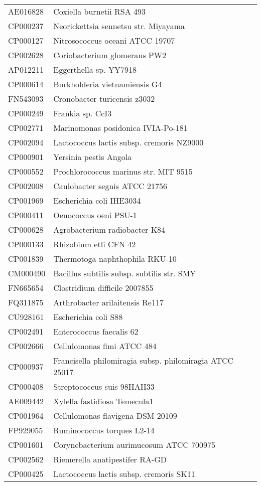 \begin{longtable}{ll}
AE016828 & Coxiella burnetii RSA 493\\
CP000237 & Neorickettsia sennetsu str. Miyayama\\
CP000127 & Nitrosococcus oceani ATCC 19707\\
CP002628 & Coriobacterium glomerans PW2\\
AP012211 & Eggerthella sp. YY7918\\
CP000614 & Burkholderia vietnamiensis G4\\
FN543093 & Cronobacter turicensis z3032\\
CP000249 & Frankia sp. CcI3\\
CP002771 & Marinomonas posidonica IVIA-Po-181\\
CP002094 & Lactococcus lactis subsp. cremoris NZ9000\\
CP000901 & Yersinia pestis Angola\\
CP000552 & Prochlorococcus marinus str. MIT 9515\\
CP002008 & Caulobacter segnis ATCC 21756\\
CP001969 & Escherichia coli IHE3034\\
CP000411 & Oenococcus oeni PSU-1\\
CP000628 & Agrobacterium radiobacter K84\\
CP000133 & Rhizobium etli CFN 42\\
CP001839 & Thermotoga naphthophila RKU-10\\
CM000490 & Bacillus subtilis subsp. subtilis str. SMY\\
FN665654 & Clostridium difficile 2007855\\
FQ311875 & Arthrobacter arilaitensis Re117\\
CU928161 & Escherichia coli S88\\
CP002491 & Enterococcus faecalis 62\\
CP002666 & Cellulomonas fimi ATCC 484\\
CP000937 & Francisella philomiragia subsp. philomiragia ATCC 25017\\
CP000408 & Streptococcus suis 98HAH33\\
AE009442 & Xylella fastidiosa Temecula1\\
CP001964 & Cellulomonas flavigena DSM 20109\\
FP929055 & Ruminococcus torques L2-14\\
CP001601 & Corynebacterium aurimucosum ATCC 700975\\
CP002562 & Riemerella anatipestifer RA-GD\\
CP000425 & Lactococcus lactis subsp. cremoris SK11\\

\end{longtable}
